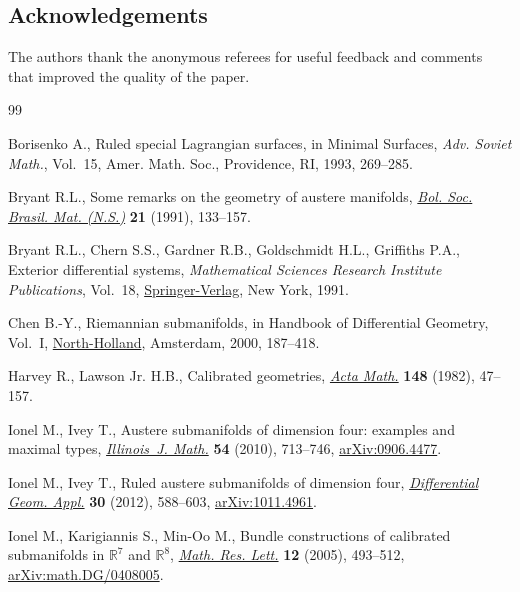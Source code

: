 \documentclass[pdftex]{sigma}
\numberwithin{equation}{section}
\begin{document}
\subsection*{Acknowledgements}
The authors thank the anonymous referees for useful feedback and comments that improved the quality of the paper.

\begin{thebibliography}{99}
\footnotesize\itemsep=0pt

Borisenko A., Ruled special {L}agrangian surfaces, in Minimal Surfaces,
 \textit{Adv. Soviet Math.}, Vol.~15, Amer. Math. Soc., Providence, RI, 1993,
 269--285.

Bryant R.L., Some remarks on the geometry of austere manifolds, \href{https://doi.org/10.1007/BF01237361}{\textit{Bol.
 Soc. Brasil. Mat. (N.S.)}} \textbf{21} (1991), 133--157.

Bryant R.L., Chern S.S., Gardner R.B., Goldschmidt H.L., Griffiths P.A.,
 Exterior differential systems, \textit{Mathematical Sciences Research
 Institute Publications}, Vol.~18, \href{https://doi.org/10.1007/978-1-4613-9714-4}{Springer-Verlag}, New York, 1991.

Chen B.-Y., Riemannian submanifolds, in Handbook of Differential Geometry,
 {V}ol.~{I}, \href{https://doi.org/10.1016/S1874-5741(00)80006-0}{North-Holland}, Amsterdam, 2000, 187--418.

Harvey R., Lawson Jr. H.B., Calibrated geometries, \href{https://doi.org/10.1007/BF02392726}{\textit{Acta Math.}}
 \textbf{148} (1982), 47--157.

Ionel M., Ivey T., Austere submanifolds of dimension four: examples and maximal
 types, \href{https://doi.org/10.1215/ijm/1318598678}{\textit{Illinois~J. Math.}} \textbf{54} (2010), 713--746,
 \href{https://arxiv.org/abs/0906.4477}{arXiv:0906.4477}.

Ionel M., Ivey T., Ruled austere submanifolds of dimension four,
 \href{https://doi.org/10.1016/j.difgeo.2012.07.007}{\textit{Differential Geom. Appl.}} \textbf{30} (2012), 588--603,
 \href{https://arxiv.org/abs/1011.4961}{arXiv:1011.4961}.

Ionel M., Karigiannis S., Min-Oo M., Bundle constructions of calibrated
 submanifolds in {${\mathbb R}^7$} and {${\mathbb R}^8$}, \href{https://doi.org/10.4310/MRL.2005.v12.n4.a5}{\textit{Math. Res.
 Lett.}} \textbf{12} (2005), 493--512, \href{https://arxiv.org/abs/math.DG/0408005}{arXiv:math.DG/0408005}.


\end{thebibliography}
\end{document}
